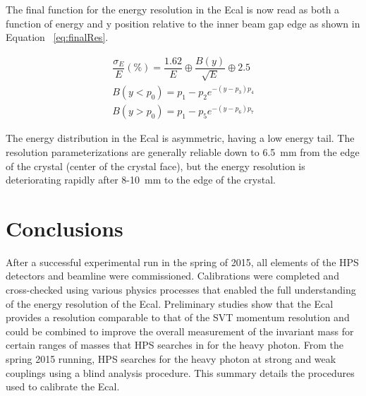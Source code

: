 \documentclass[twoside]{article}
\begin{document}
\begin{multicols}{2}
 
 The final function for the energy resolution in the Ecal is now read as both a function of energy and y position relative to the inner beam gap edge as shown in Equation ~\eqref{eq:finalRes}.
 
 \begin{equation}
\begin{split}
\label{eq:finalRes}
\dfrac{\sigma_E}{E}(\%)=\dfrac{1.62}{E}\oplus \dfrac{B(y)}{\sqrt{E}} \oplus 2.5 \\
B(y<p_0) = p_1-p_2 e^{-(y-p_3)p_4}\\
B(y>p_0) = p_1-p_5 e^{-(y-p_6)p_7}
\end{split}
\end{equation}

The energy distribution in the Ecal is asymmetric, having a low energy tail. The resolution parameterizations are generally reliable down to 6.5~mm from the edge of the crystal (center of the crystal face), but the energy resolution is deteriorating rapidly after 8-10~mm to the edge of the crystal. 
  



\section{Conclusions}

After a successful experimental run in the spring of 2015, all elements of the HPS detectors and beamline were commissioned. Calibrations were completed and cross-checked using various physics processes that enabled the full understanding of the energy resolution of the Ecal. Preliminary studies show that the Ecal provides a resolution comparable to that of the SVT momentum resolution and could be combined to improve the overall measurement of the invariant mass for certain ranges of masses that HPS searches in for the heavy photon. From the spring 2015 running, HPS searches for the heavy photon at strong and weak couplings using a blind analysis procedure. This summary details the procedures used to calibrate the Ecal.  


\begin{thebibliography}{99} %


\end{thebibliography}
\end{multicols}
\end{document}
